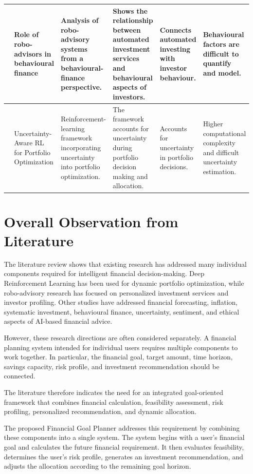 {{\begin{longtable}{|>{\centering\arraybackslash}p{}|p{}|p{}|p{}|p{}|p{}|}
23 & Role of robo-advisors in behavioural finance & Analysis of robo-advisory systems from a behavioural-finance perspective. & Shows the relationship between automated investment services and behavioural aspects of investors. & Connects automated investing with investor behaviour. & Behavioural factors are difficult to quantify and model. \\ \hline

24 & Uncertainty-Aware RL for Portfolio Optimization & Reinforcement-learning framework incorporating uncertainty into portfolio optimization. & The framework accounts for uncertainty during portfolio decision making and allocation. & Accounts for uncertainty in portfolio decisions. & Higher computational complexity and difficult uncertainty estimation. \\ \hline

\end{longtable}
}

\section{Overall Observation from Literature}
The literature review shows that existing research has addressed many individual components required for intelligent financial decision-making. Deep Reinforcement Learning has been used for dynamic portfolio optimization, while robo-advisory research has focused on personalized investment services and investor profiling. Other studies have addressed financial forecasting, inflation, systematic investment, behavioural finance, uncertainty, sentiment, and ethical aspects of AI-based financial advice.

However, these research directions are often considered separately. A financial planning system intended for individual users requires multiple components to work together. In particular, the financial goal, target amount, time horizon, savings capacity, risk profile, and investment recommendation should be connected.

The literature therefore indicates the need for an integrated goal-oriented framework that combines financial calculation, feasibility assessment, risk profiling, personalized recommendation, and dynamic allocation.

The proposed Financial Goal Planner addresses this requirement by combining these components into a single system. The system begins with a user's financial goal and calculates the future financial requirement. It then evaluates feasibility, determines the user's risk profile, generates an investment recommendation, and adjusts the allocation according to the remaining goal horizon.

}
